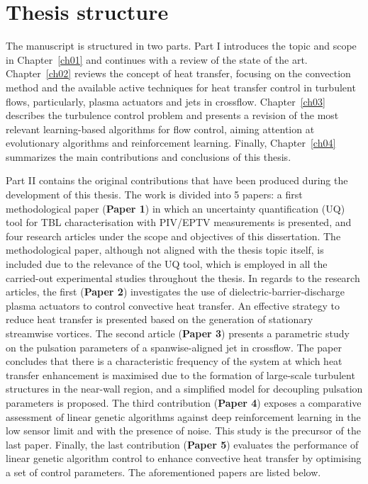 \section{Thesis structure}
%
The manuscript is structured in two parts. Part I introduces the topic and scope in Chapter~\ref{ch01} and continues with a review of the state of the art. Chapter~\ref{ch02} reviews the concept of heat transfer, focusing on the convection method and the available active techniques for heat transfer control in turbulent flows, particularly, plasma actuators and jets in crossflow. Chapter~\ref{ch03} describes the turbulence control problem and presents a revision of the most relevant learning-based algorithms for flow control, aiming attention at evolutionary algorithms and reinforcement learning. Finally, Chapter~\ref{ch04} summarizes the main contributions and conclusions of this thesis.

Part II contains the original contributions that have been produced during the development of this thesis. The work is divided into 5 papers: a first methodological paper (\textbf{Paper 1}) in which an uncertainty quantification (UQ) tool for TBL characterisation with PIV/EPTV measurements is presented, and four research articles under the scope and objectives of this dissertation. The methodological paper, although not aligned with the thesis topic itself, is included due to the relevance of the UQ tool, which is employed in all the carried-out experimental studies throughout the thesis.
In regards to the research articles, the first (\textbf{Paper 2}) investigates the use of dielectric-barrier-discharge plasma actuators to control convective heat transfer. An effective strategy to reduce heat transfer is presented based on the generation of stationary streamwise vortices.
The second article (\textbf{Paper 3}) presents a parametric study on the pulsation parameters of a spanwise-aligned jet in crossflow. The paper concludes that there is a characteristic frequency of the system at which heat transfer enhancement is maximised due to the formation of large-scale turbulent structures in the near-wall region, and a simplified model for decoupling pulsation parameters is proposed. 
The third contribution (\textbf{Paper 4}) exposes a comparative assessment of linear genetic algorithms against deep reinforcement learning in the low sensor limit and with the presence of noise. This study is the precursor of the last paper.
Finally, the last contribution (\textbf{Paper 5}) evaluates the performance of linear genetic algorithm control to enhance convective heat transfer by optimising a set of control parameters.
The aforementioned papers are listed below.\\

